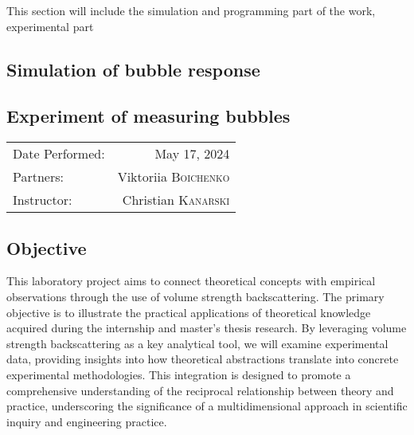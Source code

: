 This section will include the simulation and programming part of the work, experimental part

\subsection{Simulation of bubble response}

\subsection{Experiment of measuring bubbles}


\begin{center}
	\begin{tabular}{l r}
		Date Performed: & May 17, 2024 \\ %
		Partners: & Viktoriia \textsc{Boichenko} \\
		Instructor: & Christian \textsc{Kanarski} %
	\end{tabular}
\end{center}



\subsection{Objective}

This laboratory project aims to connect theoretical concepts with empirical observations through the use of volume strength backscattering. The primary objective is to illustrate the practical applications of theoretical knowledge acquired during the internship and master’s thesis research. By leveraging volume strength backscattering as a key analytical tool, we will examine experimental data, providing insights into how theoretical abstractions translate into concrete experimental methodologies. This integration is designed to promote a comprehensive understanding of the reciprocal relationship between theory and practice, underscoring the significance of a multidimensional approach in scientific inquiry and engineering practice.

